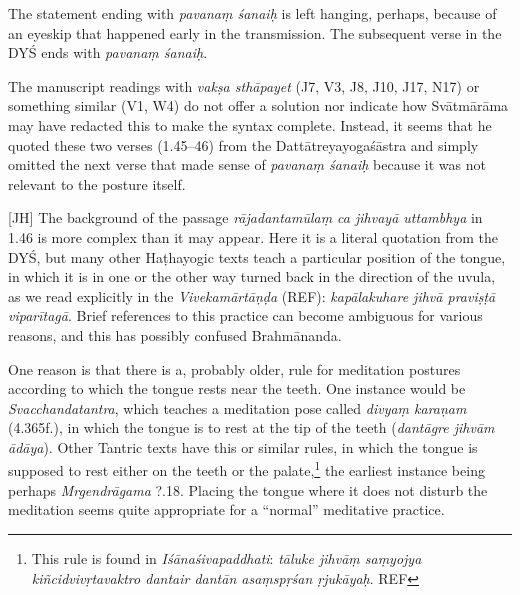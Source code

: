 \begin{ekdosis}
\begin{philcomm}[hp01_045]
The statement ending with \emph{pavanaṃ śanaiḥ} is left hanging, perhaps, because of an eyeskip that happened early in the transmission. The subsequent verse in the DYŚ ends with \emph{pavanaṃ śanaiḥ}.


\begin{versinnote}
\end{versinnote}

The manuscript readings with \emph{vakṣa sthāpayet} (J7, V3, J8, J10, J17, N17) or something similar (V1, W4) do not offer a solution nor indicate how Svātmārāma may have redacted this to make the syntax complete. Instead, it seems that he quoted these two verses (1.45–46) from the Dattātreyayogaśāstra and simply omitted the next verse that made sense of \emph{pavanaṃ śanaiḥ} because it was not relevant to the posture itself.

[JH] The background of the passage \emph{rājadantamūlaṃ ca jihvayā uttambhya} in 1.46 is more complex
than it may appear. Here it is a literal quotation from the DYŚ, but many other Haṭhayogic texts
teach a particular position of the tongue, in which it is in one or the other way turned back in
the direction of the uvula, as we read explicitly in the \emph{Vivekamārtāṇḍa} (REF):
\emph{kapālakuhare jihvā praviṣṭā viparītagā}. Brief references to this practice can become
ambiguous for various reasons, and this has possibly confused Brahmānanda.

One reason is that there is a, probably older, rule for meditation postures according to which the
tongue rests near the teeth. One instance would be \emph{Svacchandatantra}, which teaches a
meditation pose called \emph{divyaṃ karaṇam} (4.365f.), in which the tongue is to rest at the tip
of the teeth (\emph{dantāgre jihvām ādāya}). Other Tantric texts have this or similar rules, in
which the tongue is supposed to rest either on the teeth or the palate,\footnote{This rule is
found in \emph{Iśānaśivapaddhati}: \emph{tāluke jihvāṃ saṃyojya kiñcidvivṛtavaktro dantair dantān
  asaṃspṛśan ṛjukāyaḥ}. REF} the earliest instance being perhaps \emph{Mrgendrāgama} ?.18.
Placing the tongue where it does not disturb the meditation seems quite appropriate for a
``normal'' meditative practice.


\end{philcomm}
\end{ekdosis}
